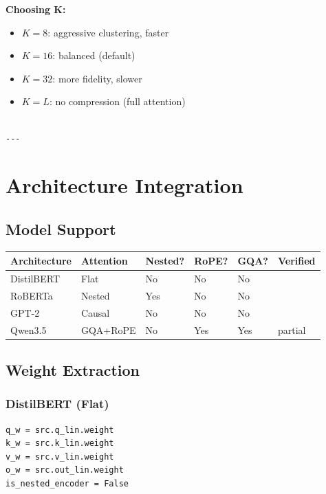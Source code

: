 \textbf{Choosing K:}

\begin{itemize}
\item $K = 8$: aggressive clustering, faster
\item $K = 16$: balanced (default)
\item $K = 32$: more fidelity, slower
\item $K = L$: no compression (full attention)
\end{itemize}
\begin{lstlisting}

---
\end{lstlisting}

\section{Architecture Integration}

\subsection{Model Support}

\begin{table}[H]
\centering
\small
\begin{tabular}{llllll}
\toprule
\textbf{Architecture} & \textbf{Attention} & \textbf{Nested?} & \textbf{RoPE?} & \textbf{GQA?} & \textbf{Verified} \\
\midrule
DistilBERT & Flat & No & No & No &  \\
RoBERTa & Nested & Yes & No & No &  \\
GPT-2 & Causal & No & No & No &  \\
Qwen3.5 & GQA+RoPE & No & Yes & Yes & partial \\
\bottomrule
\end{tabular}
\end{table}

\subsection{Weight Extraction}

\subsubsection{DistilBERT (Flat)}
\begin{lstlisting}
q_w = src.q_lin.weight
k_w = src.k_lin.weight
v_w = src.v_lin.weight
o_w = src.out_lin.weight
is_nested_encoder = False
\end{lstlisting}

